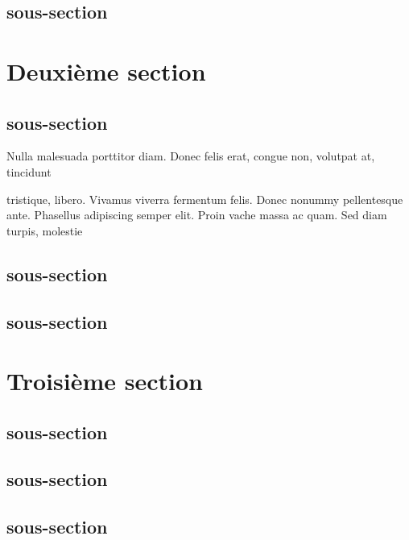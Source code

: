 \subsection{sous-section}
\lipsum[2]

\section{Deuxième section}
\subsection{sous-section}
\lipsum[2] Nulla malesuada porttitor diam. Donec felis erat, congue non, volutpat at, tincidunt

tristique, libero. Vivamus viverra fermentum felis. Donec nonummy pellentesque ante. Phasellus
adipiscing semper elit. Proin \Gls{vache} massa ac quam. Sed diam turpis, molestie

\subsection{sous-section}
\lipsum[2]
\subsection{sous-section}
\lipsum[2]

\section{Troisième section}
\subsection{sous-section}
\lipsum[2]
\subsection{sous-section}
\lipsum[2]
\subsection{sous-section}
\lipsum[2]